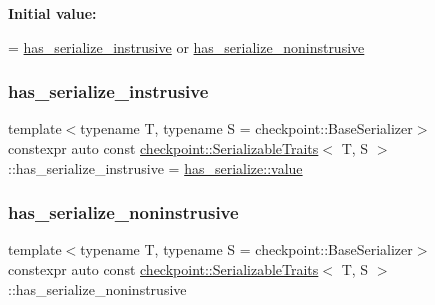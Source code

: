 {\bfseries Initial value\+:}
\begin{DoxyCode}
=
    \hyperlink{structcheckpoint_1_1_serializable_traits_a9e6855e572198a99854e9e8d2ac8b9d7}{has\_serialize\_instrusive} or 
      \hyperlink{structcheckpoint_1_1_serializable_traits_a2b02dea52e9cce1e6ec8e251c414e2e5}{has\_serialize\_noninstrusive}
\end{DoxyCode}
\mbox{\label{structcheckpoint_1_1_serializable_traits_a9e6855e572198a99854e9e8d2ac8b9d7}} 
\subsubsection{\texorpdfstring{has\+\_\+serialize\+\_\+instrusive}{has\_serialize\_instrusive}}
{\footnotesize\ttfamily template$<$typename T, typename S = checkpoint\+::\+Base\+Serializer$>$ \\
constexpr auto const \hyperlink{structcheckpoint_1_1_serializable_traits}{checkpoint\+::\+Serializable\+Traits}$<$ T, S $>$\+::has\+\_\+serialize\+\_\+instrusive = \hyperlink{structdetection_1_1detector_a6d7d0e1bdf5903db9edbe448edccf83b}{has\+\_\+serialize\+::value}\hspace{0.3cm}{\ttfamily [static]}}

\mbox{\label{structcheckpoint_1_1_serializable_traits_a2b02dea52e9cce1e6ec8e251c414e2e5}} 
\subsubsection{\texorpdfstring{has\+\_\+serialize\+\_\+noninstrusive}{has\_serialize\_noninstrusive}}
{\footnotesize\ttfamily template$<$typename T, typename S = checkpoint\+::\+Base\+Serializer$>$ \\
constexpr auto const \hyperlink{structcheckpoint_1_1_serializable_traits}{checkpoint\+::\+Serializable\+Traits}$<$ T, S $>$\+::has\+\_\+serialize\+\_\+noninstrusive\hspace{0.3cm}{\ttfamily [static]}}

